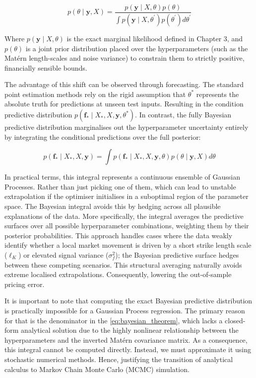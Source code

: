 \documentclass[12pt,oneside]{report}
\theoremstyle{definition}
\theoremstyle{remark}
\begin{document}
\begin{equation}
p(\theta \mid \mathbf{y}, X) = \frac{p(\mathbf{y} \mid X, \theta) p(\theta)}{\int p(\mathbf{y} \mid X, \theta^\prime) p(\theta^\prime) d\theta^\prime}
\label{eq:bayesian_theorem}
\end{equation}

Where $p(\mathbf{y} \mid X, \theta)$ is the exact marginal likelihood defined in Chapter 3, and $p(\theta)$ is a joint prior distribution placed over the hyperparameters (such as the Matérn length-scales and noise variance) to constrain them to strictly positive, financially sensible bounds.

The advantage of this shift can be observed through forecasting. The standard point estimation methods rely on the rigid assumption that $\theta^*$ represents the absolute truth for predictions at unseen test inputs. Resulting in the condition predictive distribution $p(\mathbf{f}_* \mid X_*, X, \mathbf{y}, \theta^*)$. In contrast, the fully Bayesian predictive distribution marginalises out the hyperparameter uncertainty entirely by integrating the conditional predictions over the full posterior:

$$p(\mathbf{f}_* \mid X_*, X, \mathbf{y}) = \int p(\mathbf{f}_* \mid X_*, X, \mathbf{y}, \theta) p(\theta \mid \mathbf{y}, X) d\theta$$

In practical terms, this integral represents a continuous ensemble of Gaussian Processes. Rather than just picking one of them, which can lead to unstable extrapolation if the optimiser initialises in a suboptimal region of the parameter space. The Bayesian integral avoids this by hedging across all plausible explanations of the data. More specifically, the integral averages the predictive surfaces over all possible hyperparameter combinations, weighting them by their posterior probabilities. This approach handles cases where the data weakly identify whether a local market movement is driven by a short strike length scale ($\ell_K$) or elevated signal variance ($\sigma_f^2$); the Bayesian predictive surface hedges between these competing scenarios. This structural averaging naturally avoids extreme localised extrapolations. Consequently, lowering the out-of-sample pricing error.

It is important to note that computing the exact Bayesian predictive distribution is practically impossible for a Gaussian Process regression. The primary reason for that is the denominator in the \eqref{eq:bayesian_theorem}, which lacks a closed-form analytical solution due to the highly nonlinear relationship between the hyperparameters and the inverted Matérn covariance matrix. As a consequence, this integral cannot be computed directly. Instead, we must approximate it using stochastic numerical methods. Hence, justifying the transition of analytical calculus to Markov Chain Monte Carlo (MCMC) simulation.
\end{document}
